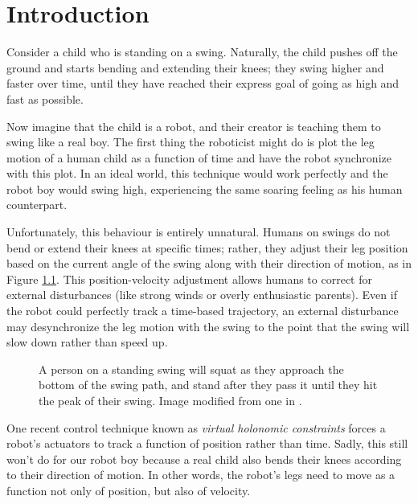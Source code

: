 

\chapter{Introduction}
Consider a child who is standing on a swing.
Naturally, the child pushes off the ground and starts bending and extending
their knees; they swing higher and faster over time, until they 
have reached their express goal of going as high and fast as possible.

Now imagine that the child is a robot, and their creator is teaching them to
swing like a real boy.
The first thing the roboticist might do is plot the leg motion of a human child
as a function of time and have the robot synchronize with this plot.
In an ideal world, this technique would work perfectly and the robot boy would
swing high, experiencing the same soaring feeling as his human counterpart.

Unfortunately, this behaviour is entirely unnatural. 
Humans on swings do not bend or extend their knees at specific times; rather,
they adjust their leg position based on the current angle of the swing along
with their direction of motion, as in Figure \ref{fig:swing-pos-vel}.
This position-velocity adjustment allows humans to correct for external
disturbances (like strong winds or overly enthusiastic parents).
Even if the robot could perfectly track a time-based trajectory, an external
disturbance may desynchronize the leg motion with the swing to the point that
the swing will slow down rather than speed up.

\begin{figure}
    \centering
    \caption{A person on a standing swing will squat as they approach the
        bottom of the swing path, and stand after they pass it until they hit
        the peak of their swing. Image modified from one in
    \cite{pumping_swing_standing_squatting}.}
    \label{fig:swing-pos-vel}
\end{figure}

One recent control technique known as \textit{virtual holonomic constraints}
forces a robot's actuators to track a function of position rather than time.
Sadly, this still won't do for our robot boy because a real child also bends
their knees according to their direction of motion.
In other words, the robot's legs need to move as a function not only of
position, but also of velocity.

